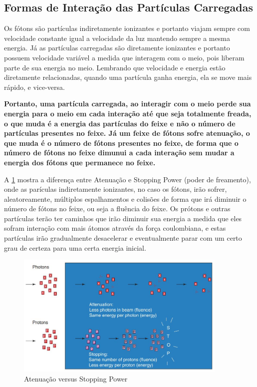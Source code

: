 \documentclass[11pt,a4paper]{article}
\begin{document}
\subsection*{Formas de Interação das Partículas Carregadas}


    Os fótons são partículas indiretamente ionizantes e portanto viajam sempre com velocidade constante igual a velocidade da luz mantendo sempre a mesma energia. Já as partículas carregadas são diretamente ionizantes e portanto possuem velocidade variável a medida que interagem com o meio, pois liberam parte de sua energia no meio. Lembrando que velocidade e energia estão diretamente relacionadas, quando uma partícula ganha energia, ela se move mais rápido, e vice-versa.

    \textbf{\textcolor{CarnationPink}{Portanto, uma partícula carregada, ao interagir com o meio perde sua energia para o meio em cada interação até que seja totalmente freada, o que muda é a energia das partículas do feixe e não o número de partículas presentes no feixe. Já um feixe de fótons sofre atenuação, o que muda é o número de fótons presentes no feixe, de forma que o número de fótons no feixe dimunui a cada interação sem mudar a energia dos fótons que permanece no feixe.}}


    A \ref{fig:atenuacaoVsStoppingPower} mostra a diferença entre Atenuação e Stopping Power (poder de freamento), onde as parículas indiretamente ionizantes, no caso os fótons, irão sofrer, aleatoreamente, múltiplos espalhamentos e colisões de forma que irá diminuir o número de fótons no feixe, ou seja a fluência do feixe. Os prótons e outras partículas terão ter caminhos que irão diminuir sua energia a medida que eles sofram interação com mais átomos através da força coulombiana, e estas partículas irão gradualmente desacelerar e eventualmente parar com um certo grau de certeza para uma certa energia inicial.

        
            \begin{figure}[h]
                \centering
                \includegraphics[width=0.9\textwidth]{Imagens/atenuacaoVsStoppingPower.JPG}
                \caption{Atenuação versus Stopping Power}
                \label{fig:atenuacaoVsStoppingPower}                
            \end{figure}
            
\end{document}
